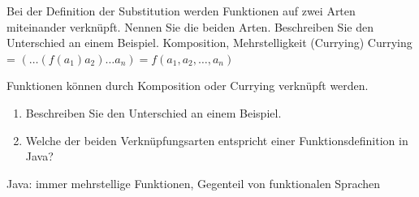 \begin{card}
	Bei der Definition der Substitution werden Funktionen auf zwei Arten miteinander verknüpft. Nennen Sie die beiden Arten. Beschreiben Sie den Unterschied an einem Beispiel.
	\hr
	Komposition, Mehrstelligkeit (Currying)
	Currying = $(\dots (f(a_1)a_2) \dots a_n) = f(a_1,a_2, \dots, a_n)$
\end{card}

\begin{card}
	Funktionen können durch Komposition oder Currying verknüpft werden.
	\begin{enumerate}
	\item Beschreiben Sie den Unterschied an einem Beispiel.
	\item Welche der beiden Verknüpfungsarten entspricht einer Funktionsdefinition in Java?
	\end{enumerate}
	\hr
	Java: immer mehrstellige Funktionen, Gegenteil von funktionalen Sprachen
\end{card}